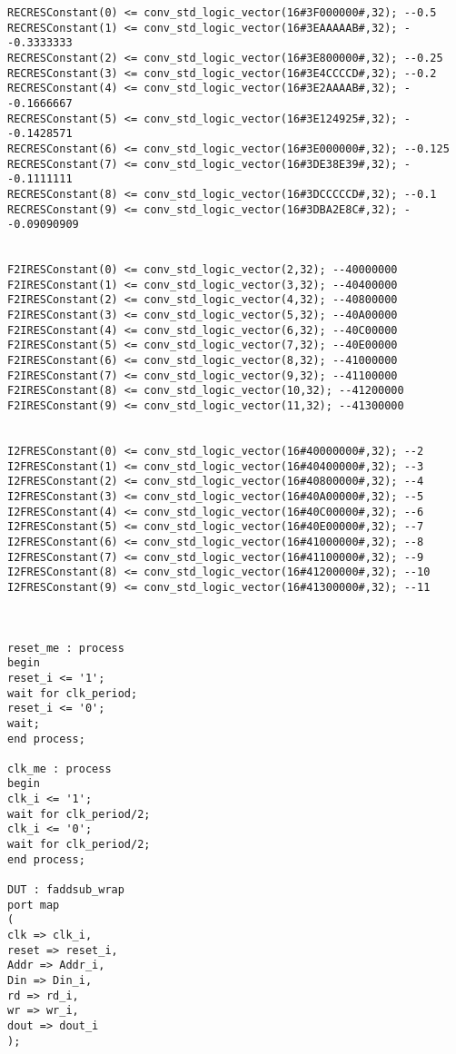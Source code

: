 \documentclass[conference]{IEEEtran}
\begin{document}
\begin{lstlisting}
RECRESConstant(0) <= conv_std_logic_vector(16#3F000000#,32); --0.5
RECRESConstant(1) <= conv_std_logic_vector(16#3EAAAAAB#,32); --0.3333333
RECRESConstant(2) <= conv_std_logic_vector(16#3E800000#,32); --0.25
RECRESConstant(3) <= conv_std_logic_vector(16#3E4CCCCD#,32); --0.2
RECRESConstant(4) <= conv_std_logic_vector(16#3E2AAAAB#,32); --0.1666667
RECRESConstant(5) <= conv_std_logic_vector(16#3E124925#,32); --0.1428571
RECRESConstant(6) <= conv_std_logic_vector(16#3E000000#,32); --0.125
RECRESConstant(7) <= conv_std_logic_vector(16#3DE38E39#,32); --0.1111111
RECRESConstant(8) <= conv_std_logic_vector(16#3DCCCCCD#,32); --0.1
RECRESConstant(9) <= conv_std_logic_vector(16#3DBA2E8C#,32); --0.09090909


F2IRESConstant(0) <= conv_std_logic_vector(2,32); --40000000
F2IRESConstant(1) <= conv_std_logic_vector(3,32); --40400000
F2IRESConstant(2) <= conv_std_logic_vector(4,32); --40800000
F2IRESConstant(3) <= conv_std_logic_vector(5,32); --40A00000
F2IRESConstant(4) <= conv_std_logic_vector(6,32); --40C00000
F2IRESConstant(5) <= conv_std_logic_vector(7,32); --40E00000
F2IRESConstant(6) <= conv_std_logic_vector(8,32); --41000000
F2IRESConstant(7) <= conv_std_logic_vector(9,32); --41100000
F2IRESConstant(8) <= conv_std_logic_vector(10,32); --41200000
F2IRESConstant(9) <= conv_std_logic_vector(11,32); --41300000


I2FRESConstant(0) <= conv_std_logic_vector(16#40000000#,32); --2
I2FRESConstant(1) <= conv_std_logic_vector(16#40400000#,32); --3
I2FRESConstant(2) <= conv_std_logic_vector(16#40800000#,32); --4
I2FRESConstant(3) <= conv_std_logic_vector(16#40A00000#,32); --5
I2FRESConstant(4) <= conv_std_logic_vector(16#40C00000#,32); --6
I2FRESConstant(5) <= conv_std_logic_vector(16#40E00000#,32); --7
I2FRESConstant(6) <= conv_std_logic_vector(16#41000000#,32); --8
I2FRESConstant(7) <= conv_std_logic_vector(16#41100000#,32); --9
I2FRESConstant(8) <= conv_std_logic_vector(16#41200000#,32); --10
I2FRESConstant(9) <= conv_std_logic_vector(16#41300000#,32); --11



reset_me : process
begin
reset_i <= '1';
wait for clk_period;
reset_i <= '0';
wait;
end process;

clk_me : process
begin
clk_i <= '1';
wait for clk_period/2;
clk_i <= '0';
wait for clk_period/2; 
end process;

DUT : faddsub_wrap
port map
(
clk => clk_i,
reset => reset_i,
Addr => Addr_i,
Din => Din_i,
rd => rd_i,
wr => wr_i,
dout => dout_i
);


\end{lstlisting}
\end{document}
